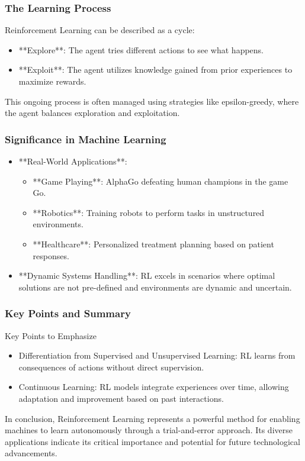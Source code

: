 \documentclass[aspectratio=169]{beamer}
\begin{document}
\begin{frame}[fragile]
  \frametitle{The Learning Process}
  
  Reinforcement Learning can be described as a cycle:
  
  \begin{itemize}
    \item **Explore**: The agent tries different actions to see what happens.
    \item **Exploit**: The agent utilizes knowledge gained from prior experiences to maximize rewards.
  \end{itemize}

  This ongoing process is often managed using strategies like epsilon-greedy, where the agent balances exploration and exploitation.

\end{frame}

\begin{frame}[fragile]
  \frametitle{Significance in Machine Learning}
  
  \begin{itemize}
    \item **Real-World Applications**: 
      \begin{itemize}
        \item **Game Playing**: AlphaGo defeating human champions in the game Go.
        \item **Robotics**: Training robots to perform tasks in unstructured environments.
        \item **Healthcare**: Personalized treatment planning based on patient responses.
      \end{itemize}
    \item **Dynamic Systems Handling**: 
      RL excels in scenarios where optimal solutions are not pre-defined and environments are dynamic and uncertain.
  \end{itemize}

\end{frame}

\begin{frame}[fragile]
  \frametitle{Key Points and Summary}

  \begin{block}{Key Points to Emphasize}
    \begin{itemize}
      \item Differentiation from Supervised and Unsupervised Learning: RL learns from consequences of actions without direct supervision.
      \item Continuous Learning: RL models integrate experiences over time, allowing adaptation and improvement based on past interactions.
    \end{itemize}
  \end{block}

  In conclusion, Reinforcement Learning represents a powerful method for enabling machines to learn autonomously through a trial-and-error approach. Its diverse applications indicate its critical importance and potential for future technological advancements.
  
\end{frame}
\end{document}
